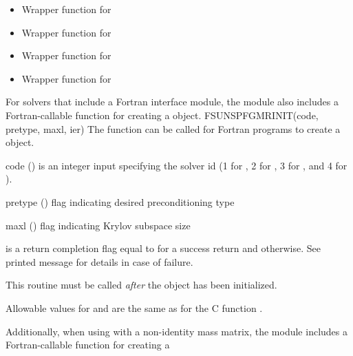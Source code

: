 \begin{itemize}

\item {}

  Wrapper function for 

\item {}

  Wrapper function for 

\item {}

  Wrapper function for 

\item {}

  Wrapper function for 

\end{itemize}
For solvers that include a Fortran interface module, the
{\sunlinsolspfgmr} module also includes a Fortran-callable function
for creating a  object.
{
  FSUNSPFGMRINIT(code, pretype, maxl, ier)
}
{
  The function  can be called for Fortran programs
  to create a {\sunlinsolspfgmr} object.
}
{
  \begin{args}[pretype]
  \item[code] ()
    is an integer input specifying the solver id (1 for {\cvode}, 2
    for {\ida}, 3 for {\kinsol}, and 4 for {\arkode}).
  \item[pretype] ()
    flag indicating desired preconditioning type
  \item[maxl] ()
    flag indicating Krylov subspace size
  \end{args}
}
{
   is a return completion flag equal to  for a success
  return and  otherwise. See printed message for details in case
  of failure.
}
{
  This routine must be called \emph{after} the {\nvector} object has
  been initialized.

  Allowable values for  and  are the same as for
  the C function .
}
Additionally, when using
{\arkode} with a non-identity mass matrix, the {\sunlinsolspfgmr} module
includes a Fortran-callable function for creating a
